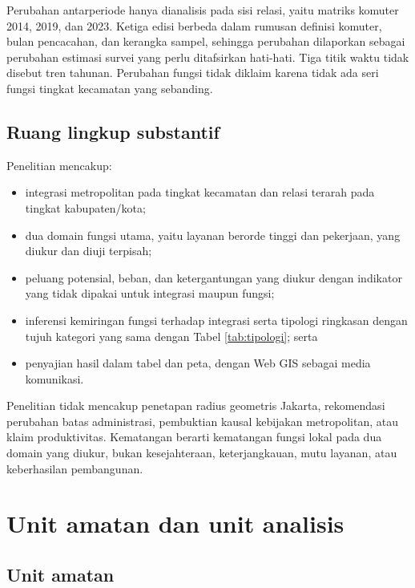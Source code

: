 \documentclass[12pt,a4paper,oneside,openany,indonesian]{report}
\begin{document}
Perubahan antarperiode hanya dianalisis pada sisi relasi, yaitu matriks
komuter 2014, 2019, dan 2023. Ketiga edisi berbeda dalam rumusan
definisi komuter, bulan pencacahan, dan kerangka sampel, sehingga
perubahan dilaporkan sebagai perubahan estimasi survei yang perlu
ditafsirkan hati-hati. Tiga titik waktu tidak disebut tren tahunan.
Perubahan fungsi tidak diklaim karena tidak ada seri fungsi tingkat
kecamatan yang sebanding.

\subsection{Ruang lingkup
substantif}\label{ruang-lingkup-substantif}

Penelitian mencakup:

\begin{itemize}
\tightlist
\item
  integrasi metropolitan pada tingkat kecamatan dan relasi terarah pada
  tingkat kabupaten/kota;
\item
  dua domain fungsi utama, yaitu layanan berorde tinggi dan pekerjaan,
  yang diukur dan diuji terpisah;
\item
  peluang potensial, beban, dan ketergantungan yang diukur dengan indikator yang
  tidak dipakai untuk integrasi maupun fungsi;
\item
  inferensi kemiringan fungsi terhadap integrasi serta tipologi ringkasan
  dengan tujuh kategori yang sama dengan Tabel \ref{tab:tipologi}; serta
\item
  penyajian hasil dalam tabel dan peta, dengan Web GIS sebagai media
  komunikasi.
\end{itemize}

Penelitian tidak mencakup penetapan radius geometris Jakarta,
rekomendasi perubahan batas administrasi, pembuktian kausal kebijakan
metropolitan, atau klaim produktivitas. Kematangan berarti kematangan
fungsi lokal pada dua domain yang diukur, bukan kesejahteraan,
keterjangkauan, mutu layanan, atau keberhasilan pembangunan.

\section{Unit amatan dan unit
analisis}\label{unit-amatan-dan-unit-analisis}

\subsection{Unit amatan}\label{unit-amatan}
\end{document}
